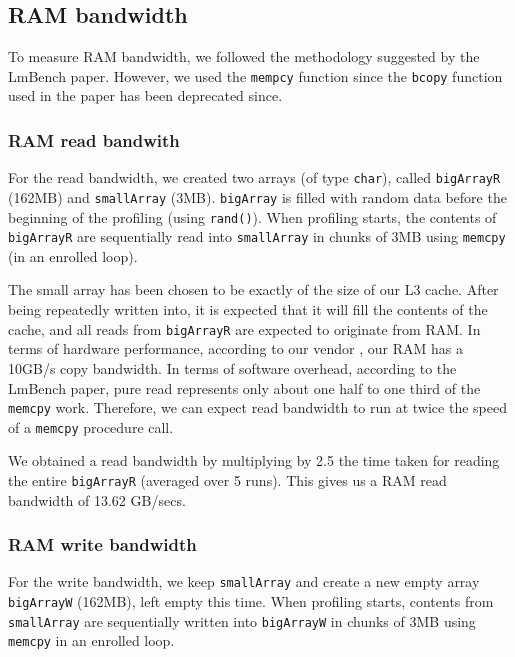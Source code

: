 \subsection{RAM bandwidth}

To measure RAM bandwidth, we followed the methodology suggested by the LmBench paper. However, we used the \texttt{mempcy} function since the \texttt{bcopy} function used in the paper has been deprecated since.

\subsubsection{RAM read bandwith}

For the read bandwidth, we created two arrays (of type \texttt{char}), called \texttt{bigArrayR} (162MB) and \texttt{smallArray} (3MB). \texttt{bigArray} is filled with random data before the beginning of the profiling (using \texttt{rand()}). When profiling starts, the contents of \texttt{bigArrayR} are sequentially read into \texttt{smallArray} in chunks of 3MB using \texttt{memcpy}  (in an enrolled loop).

The small array has been chosen to be exactly of the size of our L3 cache. After being repeatedly written into, it is expected that it will fill the contents of the cache, and all reads from \texttt{bigArrayR} are expected to originate from RAM. In terms of hardware performance, according to our vendor \cite{lenovo}, our RAM has a 10GB/s copy bandwidth. In terms of software overhead, according to the LmBench paper, pure read represents only about one half to one third of the \texttt{memcpy} work. Therefore, we can expect read bandwidth to run at twice the speed of a \texttt{memcpy} procedure call.

We obtained a read bandwidth by multiplying by 2.5 the time taken for reading the entire \texttt{bigArrayR} (averaged over 5 runs). This gives us a RAM read bandwidth of 13.62 GB/secs.

\subsubsection{RAM write bandwidth}

For the write bandwidth, we keep \texttt{smallArray} and create a new empty array \texttt{bigArrayW} (162MB), left empty this time. When profiling starts, contents from \texttt{smallArray} are sequentially written into \texttt{bigArrayW} in chunks of 3MB using \texttt{memcpy} in an enrolled loop.

